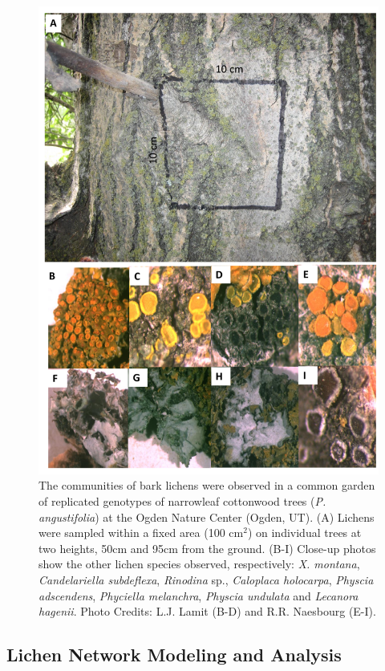 \documentclass[11pt,twocolumn,twoside,lineno]{pnas-new}
\begin{document}
{\begin{figure}[t]
\centering
\includegraphics[width=\linewidth]{lcn_sampling.png}
\caption{The communities of bark lichens were observed in a common
  garden of replicated genotypes of narrowleaf cottonwood trees
  (\textit{P. angustifolia}) at the Ogden Nature Center (Ogden,
  UT). (A) Lichens were sampled within a fixed area (100 cm$^2$) on
  individual trees at two heights, 50cm and 95cm from the
  ground. (B-I) Close-up photos show the other lichen species
  observed, respectively:  \textit{X. montana}, \textit{Candelariella
    subdeflexa}, \textit{Rinodina} sp., \textit{Caloplaca holocarpa},
  \textit{Physcia adscendens}, \textit{Phyciella melanchra},
  \textit{Physcia undulata} and \textit{Lecanora hagenii}. Photo
  Credits: L.J. Lamit (B-D) and R.R. Naesbourg (E-I).}
\label{fig:lichen_sampling}
\end{figure}


\subsection*{Lichen Network Modeling and Analysis}

}
\end{document}
